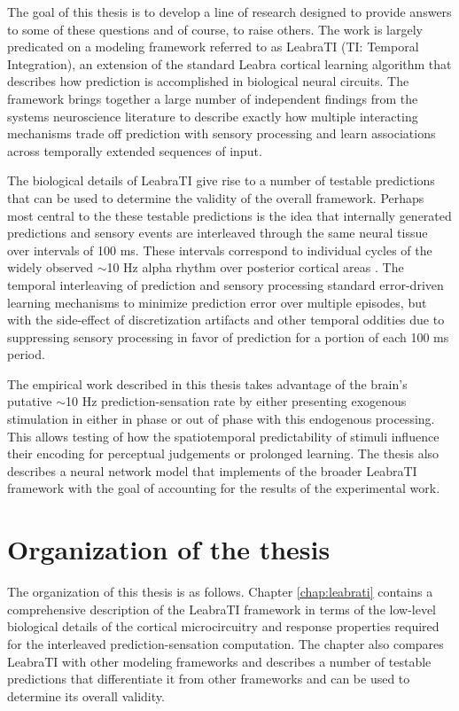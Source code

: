 \documentclass[dwyatte_dissertation.tex]{subfiles}
\begin{document}
The goal of this thesis is to develop a line of research designed to provide answers to some of these questions and of course, to raise others. The work is largely predicated on a modeling framework referred to as LeabraTI (TI: Temporal Integration), an extension of the standard Leabra cortical learning algorithm \cite{OReillyMunakata00,OReillyMunakataFrankEtAl12} that describes how prediction is accomplished in biological neural circuits. The framework brings together a large number of independent findings from the systems neuroscience literature to describe exactly how multiple interacting mechanisms trade off prediction with sensory processing and learn associations across temporally extended sequences of input. 

The biological details of LeabraTI give rise to a number of testable predictions that can be used to determine the validity of the overall framework. Perhaps most central to the these testable predictions is the idea that internally generated predictions and sensory events are interleaved through the same neural tissue over intervals of 100 ms. These intervals correspond to individual cycles of the widely observed $\sim$10 Hz alpha rhythm over posterior cortical areas \cite{PalvaPalva07,HanslmayrGrossKlimeschEtAl11,VanRullenBuschDrewesEtAl11}. The temporal interleaving of prediction and sensory processing standard error-driven learning mechanisms to minimize prediction error over multiple episodes, but with the side-effect of discretization artifacts and other temporal oddities due to suppressing sensory processing in favor of prediction for a portion of each 100 ms period.

The empirical work described in this thesis takes advantage of the brain's putative $\sim$10 Hz prediction-sensation rate by either presenting exogenous stimulation in either in phase or out of phase with this endogenous processing. This allows testing of how the spatiotemporal predictability of stimuli influence their encoding for perceptual judgements or prolonged learning. The thesis also describes a neural network model that implements of the broader LeabraTI framework with the goal of accounting for the results of the experimental work.

\section{Organization of the thesis} 
The organization of this thesis is as follows. Chapter \ref{chap:leabrati} contains a comprehensive description of the LeabraTI framework in terms of the low-level biological details of the cortical microcircuitry and response properties required for the interleaved prediction-sensation computation. The chapter also compares LeabraTI with other modeling frameworks and describes a number of testable predictions that differentiate it from other frameworks and can be used to determine its overall validity. 
\end{document}

